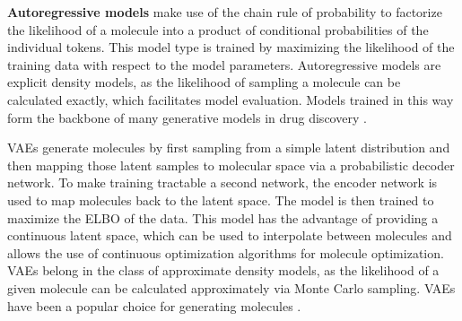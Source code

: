 \textbf{Autoregressive models} make use of the chain rule of probability to factorize the likelihood
of a molecule into a product of conditional probabilities of the individual tokens. This model type
is trained by maximizing the likelihood of the training data with respect to the model parameters.
Autoregressive models are explicit density models, as the likelihood of sampling a molecule can be
calculated exactly, which facilitates model evaluation. Models trained in this way form the backbone
of many generative models in drug discovery
\citep{gomez-bombarelliAutomaticChemicalDesign2018,seglerGeneratingFocusedMolecule2018,olivecronaMolecularDenovoDesign2017,guoAugmentedMemoryCapitalizing2023,thomasAugmentedHillClimbIncreases2022,jaquesSequenceTutorConservative2016,cohen-karlikOvercomingOrderAutoregressive2024}.

\Acp{VAE} \citep{kingmaAutoEncodingVariationalBayes2013} generate molecules by first sampling from a
simple latent distribution and then mapping those latent samples to molecular space via a
probabilistic decoder network. To make training tractable a second network, the encoder network is
used to map molecules back to the latent space. The model is then trained to maximize the \ac{ELBO}
of the data.
This model has the advantage of providing a continuous latent space, which can be used to
interpolate between molecules and allows the use of continuous optimization algorithms for molecule
optimization. \acp{VAE} belong in the class of approximate density models, as the likelihood of a given
molecule can be calculated approximately via Monte Carlo sampling. \acp{VAE} have been a popular choice
for generating molecules
\citep{gomez-bombarelliAutomaticChemicalDesign2018,kusnerGrammarVariationalAutoencoder2017,simonovskyGraphVAEGenerationSmall2018,samantaNeVAEDeepGenerative2018,jinJunctionTreeVariational2018,daiSyntaxDirectedVariationalAutoencoder2018,liuConstrainedGraphVariational2018}.


